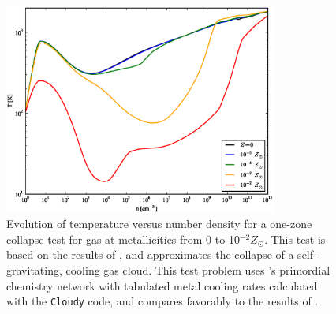\begin{figure}
  \begin{center}
    \includegraphics[width=0.8\textwidth]{figures/OneZoneCollapseTest.eps}
  \end{center}
  \caption{Evolution of temperature versus number density for a
one-zone collapse test for gas at metallicities from 0 to 10$^{-2}
Z_{\odot}$.  This test is based on the results of
\citet{2005ApJ...626..627O}, and approximates the collapse of a
self-gravitating, cooling gas cloud.  This test problem uses \enzo's
primordial chemistry network with tabulated metal cooling rates
calculated with the \texttt{Cloudy} code, and compares favorably to
the results of \citet{2005ApJ...626..627O}.}
  \label{fig.onezone}
\end{figure}
